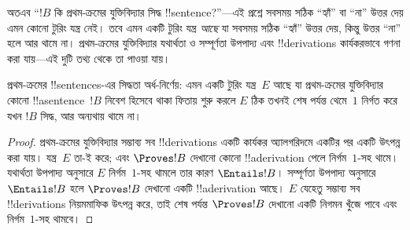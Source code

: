 \documentclass[../../../include/open-logic-section]{subfiles}
\begin{document}
\begin{explain}
অতএব “$!B$ কি প্রথম-ক্রমের যুক্তিবিদ্যার সিদ্ধ !!{sentence}?”—এই প্রশ্নে
সবসময় সঠিক “হ্যাঁ” বা “না” উত্তর দেয় এমন কোনো টুরিং যন্ত্র নেই। তবে
এমন একটি টুরিং যন্ত্র \emph{আছে} যা সবসময় সঠিক “হ্যাঁ” উত্তর দেয়, কিন্তু
উত্তর “না” হলে আর থামে না। প্রথম-ক্রমের যুক্তিবিদ্যার যথার্থতা ও
সম্পূর্ণতা উপপাদ্য এবং !!{derivation}s কার্যকরভাবে গণনা করা যায়—এই
দুটি তথ্য থেকে তা পাওয়া যায়।
\end{explain}

\begin{thm}
  প্রথম-ক্রমের !!{sentence}s-এর সিদ্ধতা অর্ধ-নির্ণেয়: এমন একটি টুরিং
  যন্ত্র~$E$ আছে যা প্রথম-ক্রমের যুক্তিবিদ্যার কোনো !!a{sentence}~$!B$
  নিবেশ হিসেবে থাকা ফিতায় শুরু করলে $E$ ঠিক তখনই শেষ পর্যন্ত থেমে~$1$
  নির্গত করে যখন $!B$ সিদ্ধ, আর অন্যথায় থামে না।
\end{thm}

\begin{proof}
  প্রথম-ক্রমের যুক্তিবিদ্যার সম্ভাব্য সব !!{derivation}s একটি কার্যকর
  অ্যালগরিদমে একটির পর একটি উৎপন্ন করা যায়। যন্ত্র~$E$ তা-ই করে; এবং
  $\Proves !B$ দেখানো কোনো !!a{derivation} পেলে নির্গম~$1$-সহ থামে।
  যথার্থতা উপপাদ্য অনুসারে $E$ নির্গম~$1$-সহ থামলে তার কারণ
  $\Entails !B$। সম্পূর্ণতা উপপাদ্য অনুসারে $\Entails !B$ হলে
  $\Proves !B$ দেখানো একটি !!a{derivation} আছে। $E$ যেহেতু সম্ভাব্য সব
  !!{derivation}s নিয়মমাফিক উৎপন্ন করে, তাই শেষ পর্যন্ত
  $\Proves !B$ দেখানো একটি নিগমন খুঁজে পাবে এবং নির্গম~$1$-সহ থামবে।
\end{proof}
\end{document}

